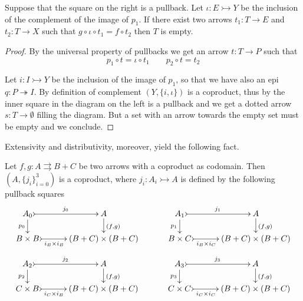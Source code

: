 \documentclass[3p]{elsarticle}
\def\X{\textbf {\textup{X}}}
\newcommand{\mto}{\rightarrowtail}
\newcommand{\eto}{\twoheadrightarrow}
\theoremstyle{remark}
\theoremstyle{definition}
\begin{document}
\noindent 
\parbox{11.5cm}{\begin{prop}\label{prop:isempty}
	Suppose that the square on the right is a pullback. Let $\iota \colon E\mto Y$ be the inclusion of the complement of the image of $p_1$. If there exist two  arrows $t_1\colon T\to E$ and $t_2\colon T\to X$ such that $g\circ \iota\circ t_1= f\circ t_2$ then $T$ is empty.
\end{prop}}\hfill \parbox{2cm}{\vspace{-.5cm}}
\begin{proof}
	By the universal property of pullbacks we get an arrow $t\colon T\to P$ such that 
	\[p_1\circ t=\iota \circ t_1 \qquad p_2\circ t=t_2\]
	\parbox{2cm}{}\hfill \parbox{10.5cm}{Let $i\colon I\mto Y$ be the inclusion of the image of $p_1$, so that we have also an epi $q\colon P\eto I$. By definition of complement $(Y, \{i, \iota\})$ is a coproduct, thus by   the inner square in the diagram on the left is a pullback and we get a dotted arrow $s\colon T\to \emptyset$ filling the diagram. But a set with an arrow towards the empty set must be empty and we conclude. \qedhere }
\end{proof}


Extensivity and distributivity, moreover, yield the following fact.

\begin{lem}\label{lem:nodim}
	Let $f,g\colon A\rightrightarrows B+C$ be two arrows with a coproduct as codomain. Then $(A, \{j_i\}_{i=0}^
	3)$ is a coproduct, where $j_i\colon A_i\mto A $ is defined by the following pullback squares
	\[\xymatrix@C=30pt@R=15pt{A_0 \ar@{>->}[r]^{j_0}  \ar[d]_{p_0}& A   \ar[d]^{(f,g)}& A_1 \ar@{>->}[r]^{j_1}  \ar[d]_{p_1} & A \ar[d]^{(f,g)} \\
		B\times B \ar@{>->}[r]_-{i_B\times i_B} & (B+C)\times (B+C) & B\times C \ar@{>->}[r]_-{i_B\times i_C} & (B+C)\times (B+C)}\]
	\[ \xymatrix@C=30pt@R=15pt{A_2 \ar@{>->}[r]^{j_2}  \ar[d]_{p_2}& A   \ar[d]^{(f,g)}& A_3 \ar@{>->}[r]^{j_3}  \ar[d]_{p_3} & A \ar[d]^{(f,g)} \\
		C\times B \ar@{>->}[r]_-{i_C\times i_B} & (B+C)\times (B+C) & C\times C \ar@{>->}[r]_-{i_C\times i_C} & (B+C)\times (B+C)}\]
\end{lem}
\end{document}
